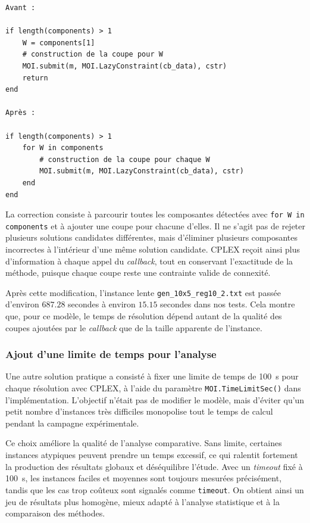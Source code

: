 \begin{verbatim}
Avant :

if length(components) > 1
    W = components[1]
    # construction de la coupe pour W
    MOI.submit(m, MOI.LazyConstraint(cb_data), cstr)
    return
end

Après :

if length(components) > 1
    for W in components
        # construction de la coupe pour chaque W
        MOI.submit(m, MOI.LazyConstraint(cb_data), cstr)
    end
end
\end{verbatim}

La correction consiste à parcourir toutes les composantes détectées avec
\texttt{for W in components} et à ajouter une coupe pour chacune d'elles. Il ne
s'agit pas de rejeter plusieurs solutions candidates différentes, mais
d'éliminer plusieurs composantes incorrectes à l'intérieur d'une même solution
candidate. CPLEX reçoit ainsi plus d'information à chaque appel du
\textit{callback}, tout en conservant l'exactitude de la méthode, puisque chaque
coupe reste une contrainte valide de connexité.

Après cette modification, l'instance lente
\texttt{gen\_10x5\_reg10\_2.txt} est passée d'environ \(687.28\) secondes à
environ \(15.15\) secondes dans nos tests. Cela montre que, pour ce modèle, le
temps de résolution dépend autant de la qualité des coupes ajoutées par le
\textit{callback} que de la taille apparente de l'instance.

\subsubsection{Ajout d'une limite de temps pour l'analyse}

Une autre solution pratique a consisté à fixer une limite de temps de
\SI{100}{\second} pour chaque résolution avec CPLEX, à l'aide du paramètre
\texttt{MOI.TimeLimitSec()} dans l'implémentation. L'objectif n'était pas de
modifier le modèle, mais d'éviter qu'un petit nombre d'instances très difficiles
monopolise tout le temps de calcul pendant la campagne expérimentale.

Ce choix améliore la qualité de l'analyse comparative. Sans limite, certaines
instances atypiques peuvent prendre un temps excessif, ce qui ralentit fortement
la production des résultats globaux et déséquilibre l'étude. Avec un
\textit{timeout} fixé à \SI{100}{\second}, les instances faciles et moyennes
sont toujours mesurées précisément, tandis que les cas trop coûteux sont
signalés comme \texttt{timeout}. On obtient ainsi un jeu de résultats plus
homogène, mieux adapté à l'analyse statistique et à la comparaison des
méthodes.

